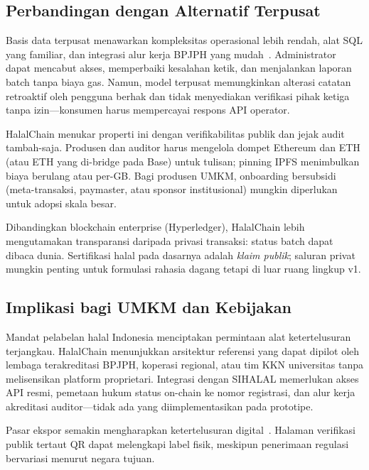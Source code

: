 \subsection{Perbandingan dengan Alternatif Terpusat}
Basis data terpusat menawarkan kompleksitas operasional lebih rendah, alat SQL yang familiar, dan integrasi alur kerja BPJPH yang mudah~\cite{underwood2016blockchain,viriyasitavat2019blockchain}.
Administrator dapat mencabut akses, memperbaiki kesalahan ketik, dan menjalankan laporan batch tanpa biaya gas.
Namun, model terpusat memungkinkan alterasi catatan retroaktif oleh pengguna berhak dan tidak menyediakan verifikasi pihak ketiga tanpa izin---konsumen harus mempercayai respons API operator.

HalalChain menukar properti ini dengan verifikabilitas publik dan jejak audit tambah-saja.
Produsen dan auditor harus mengelola dompet Ethereum dan ETH (atau ETH yang di-bridge pada Base) untuk tulisan; pinning IPFS menimbulkan biaya berulang atau per-GB.
Bagi produsen UMKM, onboarding bersubsidi (meta-transaksi, paymaster, atau sponsor institusional) mungkin diperlukan untuk adopsi skala besar.

Dibandingkan blockchain enterprise (Hyperledger), HalalChain lebih mengutamakan transparansi daripada privasi transaksi: status batch dapat dibaca dunia.
Sertifikasi halal pada dasarnya adalah \emph{klaim publik}; saluran privat mungkin penting untuk formulasi rahasia dagang tetapi di luar ruang lingkup v1.

\subsection{Implikasi bagi UMKM dan Kebijakan}
Mandat pelabelan halal Indonesia menciptakan permintaan alat ketertelusuran terjangkau.
HalalChain menunjukkan arsitektur referensi yang dapat dipilot oleh lembaga terakreditasi BPJPH, koperasi regional, atau tim KKN universitas tanpa melisensikan platform proprietari.
Integrasi dengan SIHALAL memerlukan akses API resmi, pemetaan hukum status on-chain ke nomor registrasi, dan alur kerja akreditasi auditor---tidak ada yang diimplementasikan pada prototipe.

Pasar ekspor semakin mengharapkan ketertelusuran digital~\cite{marianingsih2024halal}.
Halaman verifikasi publik tertaut QR dapat melengkapi label fisik, meskipun penerimaan regulasi bervariasi menurut negara tujuan.

